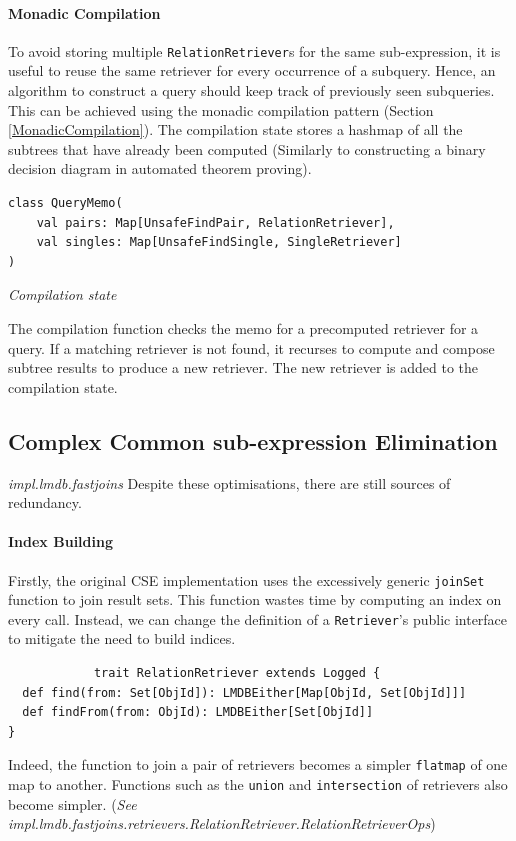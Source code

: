 \documentclass[12pt,a4paper,twoside,openright]{report}
\newcommand\codeName[1]{\texttt{#1}}
\newcommand\note[1]{\textit{#1}}
\renewcommand{\baselinestretch}{1.1}    %
\begin{document}
		
		\paragraph{Monadic Compilation}
		To avoid storing multiple \codeName{RelationRetriever}s for the same sub-expression, it is useful to reuse the same retriever for every occurrence of a subquery. Hence, an algorithm to construct a query should keep track of previously seen subqueries. This can be achieved using the monadic compilation pattern (Section \ref{MonadicCompilation}). The compilation state stores a hashmap of all the subtrees that have already been computed (Similarly to constructing a binary decision diagram in automated theorem proving). 
		
\renewcommand{\baselinestretch}{0.8}
\begin{framed}
\begin{verbatim}
class QueryMemo(
    val pairs: Map[UnsafeFindPair, RelationRetriever], 
    val singles: Map[UnsafeFindSingle, SingleRetriever]
)
\end{verbatim}
\note{Compilation state}
\end{framed}
\renewcommand{\baselinestretch}{1.1}

		The compilation function checks the memo for a precomputed retriever for a query. If a matching retriever is not found, it recurses to compute and compose subtree results to produce a new retriever. The new retriever is added to the compilation state.
		
	\subsection{Complex Common sub-expression Elimination}
	\note{impl.lmdb.fastjoins}
Despite these optimisations, there are still sources of redundancy.

		\paragraph{Index Building}
			Firstly, the original CSE implementation uses the excessively generic \codeName{joinSet} function to join result sets. This function wastes time by computing an index on every call. Instead, we can change the definition of a \codeName{Retriever}'s public interface to mitigate the need to build indices.
			\renewcommand{\baselinestretch}{0.8}
			\begin{framed}
			\begin{verbatim}
			trait RelationRetriever extends Logged {
  def find(from: Set[ObjId]): LMDBEither[Map[ObjId, Set[ObjId]]]
  def findFrom(from: ObjId): LMDBEither[Set[ObjId]]
}
			\end{verbatim}
			\end{framed}
			\renewcommand{\baselinestretch}{1.1}
			Indeed, the function to join a pair of retrievers becomes a simpler \codeName{flatmap} of one map to another. Functions such as the \codeName{union} and \codeName{intersection} of retrievers also become simpler. (\note{See impl.lmdb.fastjoins.retrievers.RelationRetriever.RelationRetrieverOps})
\end{document}
